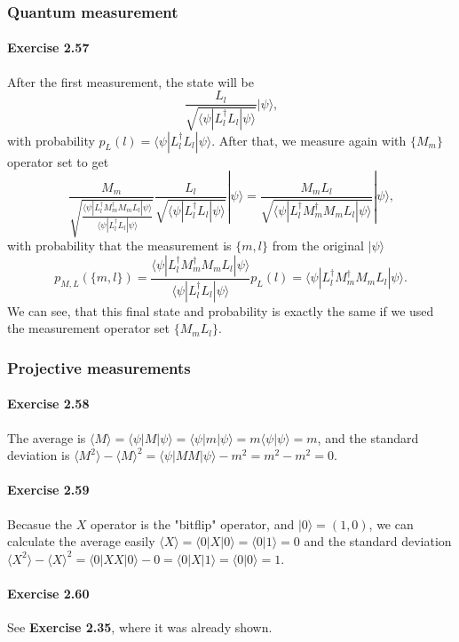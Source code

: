 \documentclass[a4paper,12pt]{article}
\newcommand{\exercise}[1]{\paragraph{Exercise #1}}
\newcommand{\la}{\langle}
\newcommand{\ra}{\rangle}
\begin{document}
    \subsubsection{Quantum measurement}

    \exercise{2.57} After the first measurement, the state will be
    \begin{equation}
        \frac{L_l}{\sqrt{ \la \psi | L_l^\dagger L_l | \psi \ra }} | \psi \ra \textrm{,}
    \end{equation}
    with probability $p_L(l) = \la \psi | L_l^\dagger L_l | \psi \ra$. After that, we measure again with $\{M_m\}$ operator set to get
    \begin{equation}
      \frac{M_m}{\sqrt{ \frac{\la \psi | L_l^\dagger M_m^\dagger M_m L_l | \psi \ra}{ \la \psi | L_l^\dagger L_l | \psi \ra }}}
        \frac{L_l}{\sqrt{ \la \psi | L_l^\dagger L_l | \psi \ra }} | \psi \ra
        =
        \frac{M_m L_l}{\sqrt{ \la \psi | L_l^\dagger M_m^\dagger M_m L_l | \psi \ra }} | \psi \ra
        \textrm{,}
    \end{equation}
    with probability that the measurement is $\{m, l\}$ from the original $|\psi\ra$
    \begin{equation}
        p_{M, L}(\{m, l\}) =
        \frac{\la \psi | L_l^\dagger M_m^\dagger M_m L_l | \psi \ra}{\la \psi | L_l^\dagger L_l | \psi \ra } p_L(l) = \la \psi | L_l^\dagger M_m^\dagger M_m L_l | \psi \ra \textrm{.}
    \end{equation}
    We can see, that this final state and probability is exactly the same if we used the measurement operator set $\{ M_m L_l \}$.

    \setcounter{subsubsection}{4}
    \subsubsection{Projective measurements}

    \exercise{2.58} The average is $\la M \ra = \la \psi | M | \psi \ra = \la \psi | m | \psi \ra = m \la \psi | \psi \ra = m$, and the standard deviation is $\la M^2 \ra - \la M \ra ^2 = \la \psi | M M | \psi \ra - m^2 = m^2 - m^2 = 0$.

    \exercise{2.59} Becasue the $X$ operator is the "bitflip" operator, and $|0\ra = (1, 0)$, we can calculate the average easily $\la X \ra = \la 0 | X | 0 \ra = \la 0 | 1 \ra = 0$ and the standard deviation $\la X^2 \ra - \la X \ra^2 = \la 0 | X X | 0 \ra - 0 = \la 0 | X | 1 \ra = \la 0 | 0 \ra = 1$.

    \exercise{2.60} See \textbf{Exercise 2.35}, where it was already shown.
\end{document}
